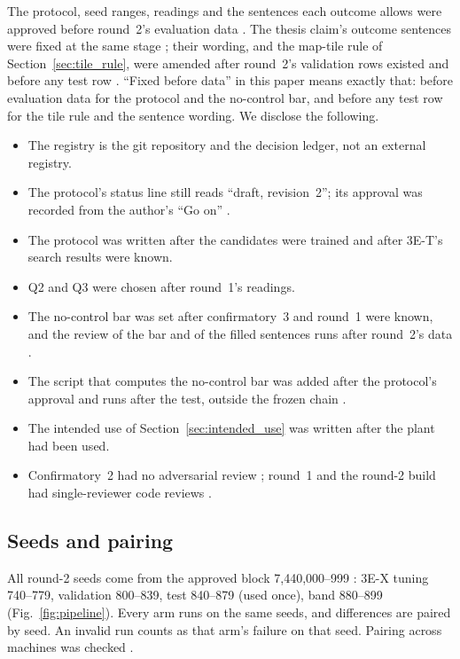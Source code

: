 The protocol, seed ranges, readings and the sentences each outcome allows were approved before round~2's evaluation data .
The thesis claim's outcome sentences were fixed at the same stage ; their wording, and the map-tile rule of Section~\ref{sec:tile_rule}, were amended after round~2's validation rows existed and before any test row .
``Fixed before data'' in this paper means exactly that: before evaluation data for the protocol and the no-control bar, and before any test row for the tile rule and the sentence wording.
We disclose the following.
\begin{itemize}
\item The registry is the git repository and the decision ledger, not an external registry.
\item The protocol's status line still reads ``draft, revision~2''; its approval was recorded from the author's ``Go on'' .
\item The protocol was written after the candidates were trained and after 3E-T's search results were known.
\item Q2 and Q3 were chosen after round~1's readings.
\item The no-control bar was set after confirmatory~3 and round~1 were known, and the review of the bar and of the filled sentences runs after round~2's data .
\item The script that computes the no-control bar was added after the protocol's approval and runs after the test, outside the frozen chain .
\item The intended use of Section~\ref{sec:intended_use} was written after the plant had been used.
\item Confirmatory~2 had no adversarial review ; round~1 and the round-2 build had single-reviewer code reviews .
\end{itemize}

\subsection{Seeds and pairing}\label{sec:seeds}

All round-2 seeds come from the approved block 7,440,000--999 : 3E-X tuning 740--779, validation 800--839, test 840--879 (used once), band 880--899 (Fig.~\ref{fig:pipeline}).
Every arm runs on the same seeds, and differences are paired by seed.
An invalid run counts as that arm's failure on that seed.
Pairing across machines was checked .

